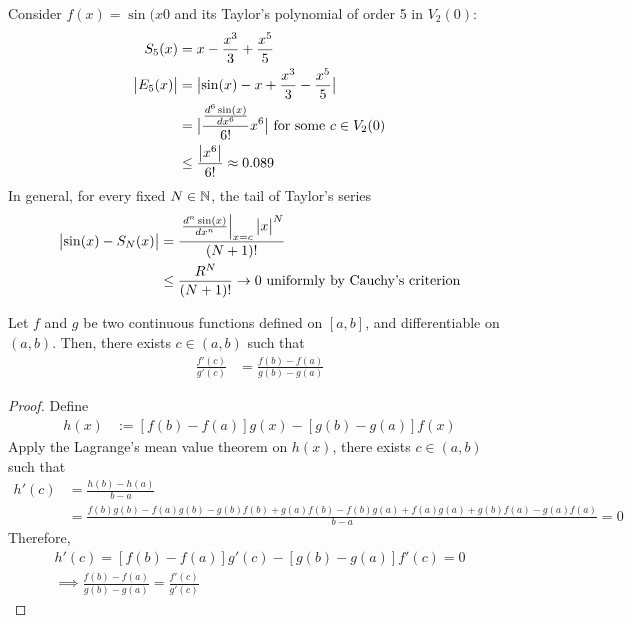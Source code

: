 \documentclass[11pt]{article}
\begin{document}
 	\begin{example}
 		Consider $f(x) = \sin(x0$ and its Taylor's polynomial of order 5 in $V_2(0)$:
 		\begin{align}
 			S_5(x) &= x - \frac{x^3}{3} + \frac{x^5}{5} \\
 			\big \vert {E_5(x)} \big \vert &= \big \vert {\sin(x) - x + \frac{x^3}{3} - \frac{x^5}{5}} \big \vert \\
 			&= \big \vert {
 				\frac{\frac{d^6 \sin(x)}{dx^6}}{6!} x^6
 			} \big \vert \text{{ for some }} c \in V_2(0) \\
 			&\leq \frac{\big \vert {x^6} \big \vert}{6!} \approx 0.089
 		\end{align}
 		In general, for every fixed $N \in \mathbb{N}$, the tail of Taylor's series 
 		\begin{align}
 			\big \vert {\sin(x) - S_N(x)} \big \vert &= \frac{
 			\left. \frac{d^n \sin(x)}{dx^n} \right |_{x=c} \big \vert {x} \big \vert^N		
 			}{
 			(N+1)!} \\
 			&\leq \frac{R^N}{(N+1)!} \to 0 \text{{ uniformly by Cauchy's criterion}}
 		\end{align}
 	\end{example}
 
	\begin{theorem}
		Let $f$ and $g$ be two continuous functions defined on $[a, b]$, and differentiable on $(a, b)$. Then, there exists $c \in (a, b)$ such that
		\begin{align}
			\frac{f'(c)}{g'(c)} &= \frac{f(b) - f(a)}{g(b) - g(a)}
		\end{align}
	\end{theorem}
	
	\begin{proof}
		Define 
		\begin{align}
			h(x) &:= [f(b) - f(a)] g(x) - [g(b) - g(a)] f(x)
		\end{align}
		Apply the Lagrange's mean value theorem on $h(x)$, there exists $c \in (a, b)$ such that
		\begin{align}
			h'(c) &= \frac{h(b)-h(a)}{b-a} \\
			&= \frac{f(b)g(b) - f(a)g(b) - g(b)f(b) + g(a) f(b) - f(b)g(a) + f(a)g(a) + g(b)f(a) - g(a)f(a)}{b-a} = 0
		\end{align}
		Therefore,
		\begin{align}
			h'(c) = [f(b) - f(a)]g'(c) - [g(b) - g(a)]f'(c) = 0 \\
			\implies \frac{f(b) - f(a)}{g(b) - g(a)} = \frac{f'(c)}{g'(c)}
		\end{align}
	\end{proof}
	
\end{document}
